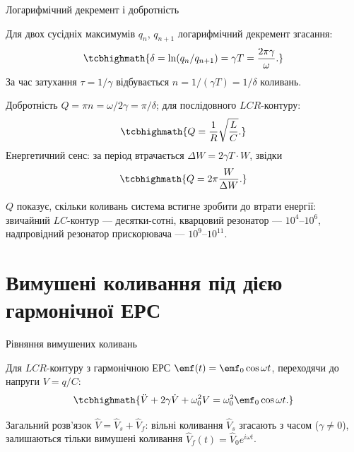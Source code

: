 \documentclass[onlytextwidth]{beamer}
\begin{document}
\begin{frame}{Логарифмічний декремент і добротність}{}
	\begin{block}{}\justifying
		Для двох сусідніх максимумів $q_n$, $q_{n+1}$ \alert{логарифмічний декремент згасання}:
		\begin{equation*}
			\tcbhighmath{
				\delta = \ln(q_n/q_{n+1}) = \gamma T = \frac{2\pi\gamma}{\omega}.
			}
		\end{equation*}
		За час затухання $\tau=1/\gamma$ відбувається $n = 1/(\gamma T) = 1/\delta$ коливань.
	\end{block}
	\begin{block}{}\justifying
		\alert{Добротність} $Q = \pi n = \omega/2\gamma = \pi/\delta$; для послідовного $LCR$-контуру:
		\begin{equation*}
			\tcbhighmath{
				Q = \frac1R\sqrt{\frac LC}.
			}
		\end{equation*}
		Енергетичний сенс: за період втрачається $\Delta W = 2\gamma T\cdot W$, звідки
		\begin{equation*}
			\tcbhighmath{
				Q = 2\pi\frac{W}{\Delta W}.
			}
		\end{equation*}
	\end{block}
	\begin{exampleblock}{}\justifying\small
		$Q$ показує, скільки коливань система встигне зробити до втрати енергії: звичайний $LC$-контур --- десятки-сотні, кварцовий резонатор --- $10^4$--$10^6$, надпровідний резонатор прискорювача --- $10^9$--$10^{11}$.
	\end{exampleblock}
\end{frame}

\section{Вимушені коливання під дією гармонічної ЕРС}

\begin{frame}{Рівняння вимушених коливань}{}
	\begin{block}{}\justifying
		Для $LCR$-контуру з гармонічною ЕРС $\emf(t)=\emf_0\cos\omega t$, переходячи до напруги $V=q/C$:
		\begin{equation*}
			\tcbhighmath{
				\ddot V + 2\gamma\dot V + \omega_0^2 V = \omega_0^2\emf_0\cos\omega t.
			}
		\end{equation*}
	\end{block}
	\begin{block}{}\justifying
		Загальний розв'язок $\hat V = \hat V_s + \hat V_f$: вільні коливання $\hat V_s$ згасають з часом ($\gamma\ne0$), залишаються тільки \alert{вимушені} коливання $\hat V_f(t) = \hat V_0 e^{i\omega t}$.
	\end{block}
\end{frame}
\end{document}

